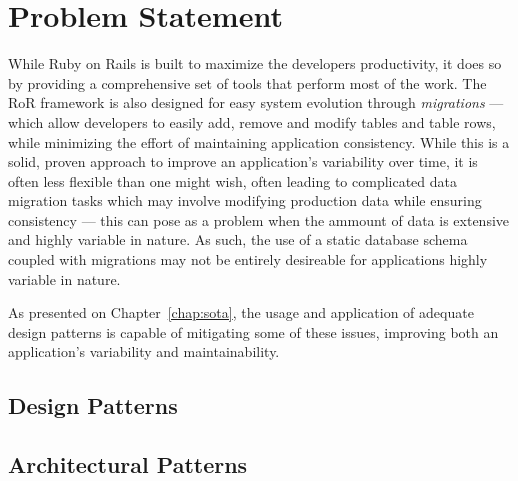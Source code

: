 \chapter{Problem Statement}\label{chap:problem_statement}

While Ruby on Rails is built to maximize the developers productivity, it does so by providing a comprehensive set of tools that perform most of the work. The RoR framework is also designed for easy system evolution through \emph{migrations} --- which allow developers to easily add, remove and modify tables and table rows, while minimizing the effort of maintaining application consistency. While this is a solid, proven approach to improve an application's variability over time, it is often less flexible than one might wish, often leading to complicated data migration tasks which may involve modifying production data while ensuring consistency --- this can pose as a problem when the ammount of data is extensive and highly variable in nature. As such, the use of a static database schema coupled with migrations may not be entirely desireable for applications highly variable in nature.

As presented on Chapter~\ref{chap:sota}, the usage and application of adequate design patterns is capable of mitigating some of these issues, improving both an application's variability and maintainability.

\section{Design Patterns}\label{sec:design_patterns}

\section{Architectural Patterns}\label{sec:architectural_patterns}


